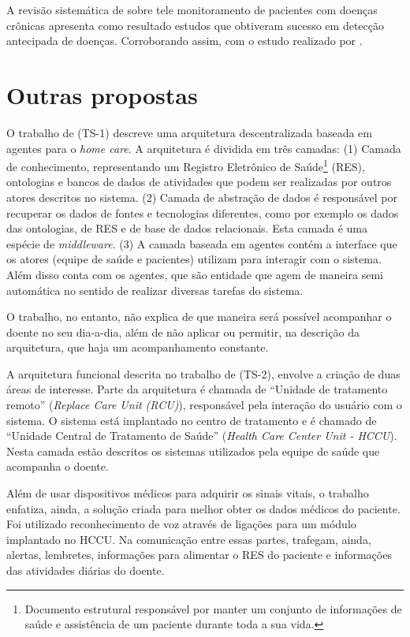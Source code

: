 A revisão sistemática de  sobre tele
monitoramento de pacientes com doenças crônicas apresenta como resultado
estudos que obtiveram sucesso em detecção antecipada de doenças. 
Corroborando assim, com o estudo realizado por
.

\section{Outras propostas} \label{sec:solucoes-semelhantes}

O trabalho de  (TS-1) descreve uma arquitetura
descentralizada baseada em agentes para o \textit{home care}. A arquitetura é
dividida em três camadas: (1) Camada de conhecimento, representando um Registro
Eletrônico de Saúde\footnote{Documento estrutural responsável por 
manter um conjunto de informações de saúde e assistência de um paciente durante 
toda a sua vida.} (RES), ontologias e bancos de dados de atividades que podem
ser realizadas por outros atores descritos no sistema. (2) Camada de abstração
de dados é responsável por recuperar os dados de fontes e tecnologias
diferentes, como por exemplo os dados das ontologias, de RES e de base de dados
relacionais. Esta camada é uma espécie de \textit{middleware}. (3) A camada
baseada em agentes contém a interface \web[] que os atores (equipe de saúde e
pacientes) utilizam para interagir com o sistema. Além disso conta com os
agentes, que são entidade que agem de maneira semi automática no sentido de
realizar diversas tarefas do sistema. 

O trabalho, no entanto, não explica de que maneira será possível acompanhar o
doente no seu dia-a-dia, além de não aplicar ou permitir, na descrição da
arquitetura, que haja um acompanhamento constante.

A arquitetura funcional descrita no trabalho de  (TS-2),
envolve a criação de duas áreas de interesse. Parte da arquitetura é chamada de
``Unidade de tratamento remoto'' (\textit{Replace Care Unit (RCU)}), responsável
pela interação do usuário com o sistema. O sistema está implantado no centro
de tratamento e é chamado de  ``Unidade Central de Tratamento de Saúde''
(\textit{Health Care Center Unit - HCCU}). Nesta camada estão descritos os
sistemas utilizados pela equipe de saúde que acompanha o doente.

Além de usar dispositivos médicos para adquirir os sinais vitais, o trabalho
enfatiza, ainda, a solução criada para melhor obter os dados médicos do
paciente. Foi utilizado reconhecimento de voz através de ligações para um
módulo implantado no HCCU. Na comunicação entre essas partes, trafegam, ainda,
alertas, lembretes, informações para alimentar o RES do paciente e informações
das atividades diárias do doente.


